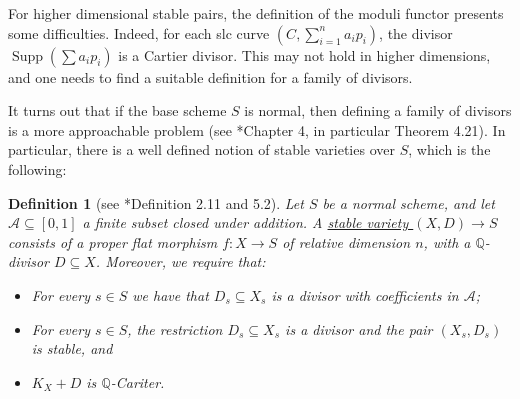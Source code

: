 \documentclass[11pt]{amsart}
\newcommand{\supp}{\operatorname{Supp}}
\newtheorem{Def}[theorem]{Definition}
\theoremstyle{definition}
\begin{document}
For higher dimensional stable pairs, the definition of the moduli functor presents some difficulties.
Indeed, for each slc curve $(C,\sum_{i=1}^n a_i p_i)$,
the divisor $\supp(\sum a_i p_i)$ is a Cartier divisor. This may not hold in higher dimensions, and one needs to find a suitable definition for a family of divisors. 

It turns out that if the base scheme $S$ is normal, then defining a family of divisors is a more approachable problem (see \cite{kollarbook}*{Chapter 4}, in particular Theorem 4.21). In particular, there is a well defined notion of stable varieties over $S$, which is the following:
\begin{Def}[see \cite{KP}*{Definition 2.11 and 5.2}]\label{Def:stable:pairs:normal:base}
 Let $S$ be a \emph{normal} scheme, and let $\mathcal{A} \subseteq [0,1]$ a finite subset closed
 under addition. A \underline{stable variety $(X,D) \to S$} consists of a proper flat morphism $f:X \to S$ of relative dimension $n$,
 with a $\mathbb{Q}$-divisor $D \subseteq X$. Moreover, we require that:
 \begin{itemize}
  \item For every
 $s \in S$ we have that $D_s \subseteq X_s$ is a divisor with coefficients in $\mathcal{A}$;
  \item For every $s \in S$, the restriction $D_s \subseteq X_s$ is a divisor and the pair $(X_s,D_s)$ is stable, and
  \item $K_X+D$ is $\mathbb{Q}$-Cariter.
 \end{itemize}

\end{Def}
\end{document}
